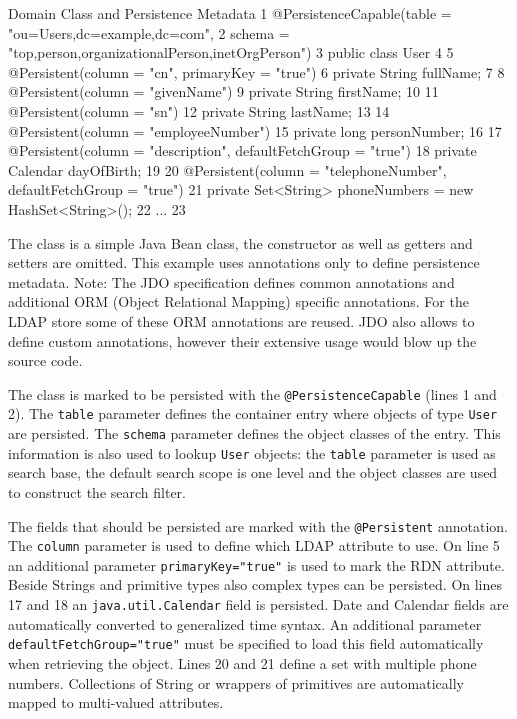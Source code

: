 \documentclass[a4paper,11pt,oneside]{article}
\begin{document}
\begin{SaveVerbatim}{Domain Class and Persistence Metadata}
 1  @PersistenceCapable(table = "ou=Users,dc=example,dc=com", 
 2      schema = "top,person,organizationalPerson,inetOrgPerson")
 3  public class User
 4  {
 5      @Persistent(column = "cn", primaryKey = "true")
 6      private String fullName;
 7  
 8      @Persistent(column = "givenName")
 9      private String firstName;
10  
11      @Persistent(column = "sn")
12      private String lastName;
13  
14      @Persistent(column = "employeeNumber")
15      private long personNumber;
16  
17      @Persistent(column = "description", defaultFetchGroup = "true")
18      private Calendar dayOfBirth;
19  
20      @Persistent(column = "telephoneNumber", defaultFetchGroup = "true")
21      private Set<String> phoneNumbers = new HashSet<String>();
22      ...
23  }
\end{SaveVerbatim}
\begin{figure}[htb]
\end{figure}

The class is a simple Java Bean class, the constructor as well as getters and setters are omitted. This example uses annotations only to define persistence metadata. Note: The JDO specification defines common annotations and additional ORM (Object Relational Mapping) specific annotations. For the LDAP store some of these ORM annotations are reused. JDO also allows to define custom annotations, however their extensive usage would blow up the source code.

The class is marked to be persisted with the \texttt{@PersistenceCapable} (lines 1 and 2). The \texttt{table} parameter defines the container entry where objects of type \texttt{User} are persisted. The \texttt{schema} parameter defines the object classes of the entry. This information is also used to lookup \texttt{User} objects: the \texttt{table} parameter is used as search base, the default search scope is one level and the object classes are used to construct the search filter.

The fields that should be persisted are marked with the \texttt{@Persistent} annotation. The \texttt{column} parameter is used to define which LDAP attribute to use. On line 5 an additional parameter \texttt{primaryKey="true"} is used to mark the RDN attribute. Beside Strings and primitive types also complex types can be persisted. On lines 17 and 18 an \texttt{java.util.Calendar} field is persisted. Date and Calendar fields are automatically converted to generalized time syntax. An additional parameter \texttt{defaultFetchGroup="true"} must be specified to load this field automatically when retrieving the object. Lines 20 and 21 define a set with multiple phone numbers. Collections of String or wrappers of primitives are automatically mapped to multi-valued attributes.
\end{document}

